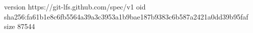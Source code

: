 version https://git-lfs.github.com/spec/v1
oid sha256:fa61b1e8c6fb5564a39a3c3953a1b9bae187b9383c6b587a2421a0dd39b95faf
size 87544
